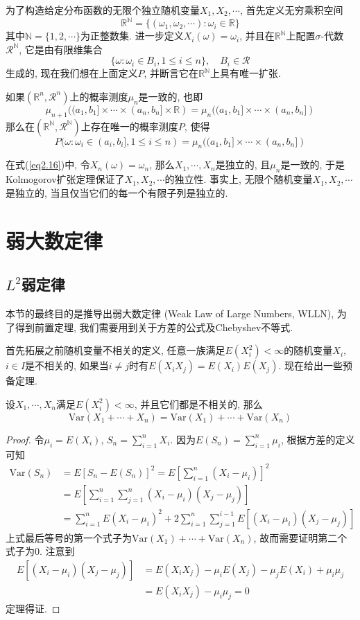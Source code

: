 \documentclass[cn, 12pt, math=mtpro2, bibstyle=apa, blue, twocol]{elegantbook}
\newcommand{\R}{\mathbb{R}}
\begin{document}
为了构造给定分布函数的无限个独立随机变量$X_1,X_2,\cdots$, 首先定义无穷乘积空间
$$\R^\mathbb{N}=\{(\omega_1,\omega_2,\cdots): \omega_i\in\R\}$$
其中$\mathbb{N}=\{1,2,\cdots\}$为正整数集. 进一步定义$X_i(\omega)=\omega_i$, 并且在$\R^\mathbb{N}$上配置$\sigma$-代数$\mathcal{R}^\mathbb{N}$, 它是由有限维集合
$$\{\omega: \omega_i\in B_i, 1\leq i\leq n\},\quad B_i\in\mathcal{R}$$
生成的, 现在我们想在上面定义$P$, 并断言它在$\R^\mathbb{N}$上具有唯一扩张.

\begin{theorem}[Kolmogorov扩张定理]
  如果$(\R^n,\mathcal{R}^n)$上的概率测度$\mu_n$是一致的, 也即
  $$\mu_{n+1}((a_1,b_1]\times\cdots\times (a_n,b_n]\times \R)=\mu_n((a_1,b_1]\times\cdots\times (a_n,b_n])$$
  那么在$(\R^\mathbb{N},\mathcal{R}^\mathbb{N})$上存在唯一的概率测度$P$, 使得
  $$P(\omega: \omega_i\in (a_i,b_i], 1\leq i\leq n)=\mu_n((a_1,b_1]\times\cdots\times (a_n,b_n])$$
\end{theorem}

在式(\ref{eq2.16})中, 令$X_n(\omega)=\omega_n$, 那么$X_1,\cdots,X_n$是独立的, 且$\mu_n$是一致的, 于是Kolmogorov扩张定理保证了$X_1,X_2,\cdots$的独立性. 事实上, 无限个随机变量$X_1,X_2,\cdots$是独立的, 当且仅当它们的每一个有限子列是独立的.
\section{弱大数定律}
\subsection{$L^2$弱定律}

本节的最终目的是推导出弱大数定律 (Weak Law of Large Numbers, WLLN), 为了得到前置定理, 我们需要用到关于方差的公式及Chebyshev不等式.

首先拓展之前随机变量不相关的定义, 任意一族满足$E(X_i^2)<\infty$的随机变量$X_i$, $i\in I$是不相关的, 如果当$i\ne j$时有$E(X_iX_j)=E(X_i)E(X_j)$. 现在给出一些预备定理.

\begin{theorem}
  设$X_1,\cdots,X_n$满足$E(X_i^2)<\infty$, 并且它们都是不相关的, 那么
  $$\text{Var}(X_1+\cdots+X_n)=\text{Var}(X_1)+\cdots+\text{Var}(X_n)$$
\end{theorem}
\begin{proof}
  令$\mu_i=E(X_i)$, $S_n=\sum_{i=1}^{n}X_i$. 因为$E(S_n)=\sum_{i=1}^{n}\mu_i$, 根据方差的定义可知
  \begin{align*}
  \text{Var}(S_n)&=E[S_n-E(S_n)]^2=E\left[\sum_{i=1}^{n}(X_i-\mu_i)\right]^2 \\
  &=E\left[\sum_{i=1}^{n}\sum_{j=1}^{n}(X_i-\mu_i)(X_j-\mu_j)\right] \\
  &=\sum_{i=1}^{n}E(X_i-\mu_i)^2+2\sum_{i=1}^{n}\sum_{j=1}^{i-1}E[(X_i-\mu_i)(X_j-\mu_j)]
  \end{align*}
  上式最后等号的第一个式子为$\text{Var}(X_1)+\cdots+\text{Var}(X_n)$, 故而需要证明第二个式子为0. 注意到
  \begin{align*}
  E[(X_i-\mu_i)(X_j-\mu_j)]&=E(X_iX_j)-\mu_iE(X_j)-\mu_jE(X_i)+\mu_i\mu_j \\
  &=E(X_iX_j)-\mu_i\mu_j=0
  \end{align*}
  定理得证.
\end{proof}
\end{document}
